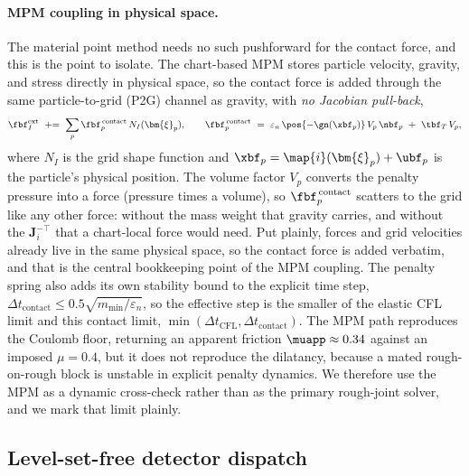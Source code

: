 \paragraph{MPM coupling in physical space.}
The material point method needs no such pushforward for the contact force, and this is the point to
isolate. The chart-based MPM stores particle velocity, gravity, and stress directly in physical
space, so the contact force is added through the same particle-to-grid (P2G) channel as gravity,
with \emph{no Jacobian pull-back},
\begin{equation}\label{eq:mpm-p2g}
\fbf_I^{\mathrm{ext}}\ \mathrel{+}=\ \sum_p \fbf_p^{\,\mathrm{contact}}\,N_I(\bm{\xi}_p),
\qquad
\fbf_p^{\,\mathrm{contact}}\ =\ \varepsilon_n\,\pos{-\gn(\xbf_p)}\,V_p\,\nbf_p\ +\ \tbf_T\,V_p ,
\end{equation}
where $N_I$ is the grid shape function and $\xbf_p=\map{i}(\bm{\xi}_p)+\ubf_p$ is the particle's
physical position. The volume factor $V_p$ converts the penalty pressure into a force (pressure times a
volume), so $\fbf_p^{\,\mathrm{contact}}$ scatters to the grid like any other force: without the mass
weight that gravity carries, and without the $\bm{J}_i^{-\top}$ that a chart-local force would need.
Put plainly, forces and grid velocities already live in the same physical space, so the contact force
is added verbatim, and that is the central bookkeeping point of the MPM coupling. The penalty spring
also adds its own stability bound to the explicit time step,
$\Delta t_{\mathrm{contact}}\le 0.5\sqrt{m_{\min}/\varepsilon_n}$, so the effective step is the smaller
of the elastic CFL limit and this contact limit, $\min(\Delta t_{\mathrm{CFL}},\Delta
t_{\mathrm{contact}})$. The MPM path reproduces the Coulomb floor, returning an apparent friction
$\muapp\approx0.34$ against an imposed $\mu=0.4$, but it does not reproduce the dilatancy, because a
mated rough-on-rough block is unstable in explicit penalty dynamics. We therefore use the MPM as a
dynamic cross-check rather than as the primary rough-joint solver, and we mark that limit plainly.

\subsection{Level-set-free detector dispatch}\label{sec:form-dispatch}

